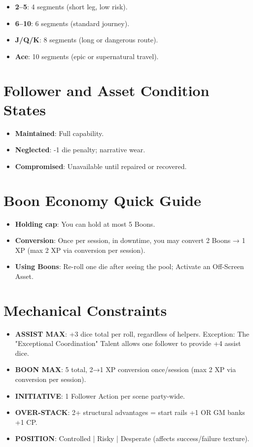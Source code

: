 \begin{itemize}
    \item \textbf{2--5}: 4 segments (short leg, low risk).
    \item \textbf{6--10}: 6 segments (standard journey).
    \item \textbf{J/Q/K}: 8 segments (long or dangerous route).
    \item \textbf{Ace}: 10 segments (epic or supernatural travel).
\end{itemize}

\section*{Follower and Asset Condition States}

\begin{itemize}
    \item \textbf{Maintained}: Full capability.
    \item \textbf{Neglected}: -1 die penalty; narrative wear.
    \item \textbf{Compromised}: Unavailable until repaired or recovered.
\end{itemize}

\section*{Boon Economy Quick Guide}

\begin{itemize}
    \item \textbf{Holding cap}: You can hold at most 5 Boons.
    \item \textbf{Conversion}: Once per session, in downtime, you may convert 2 Boons → 1 XP (max 2 XP via conversion per session).
    \item \textbf{Using Boons}: Re-roll one die after seeing the pool; Activate an Off-Screen Asset.
\end{itemize}

\section*{Mechanical Constraints}

\begin{itemize}
    \item \textbf{ASSIST MAX}: +3 dice total per roll, regardless of helpers. Exception: The "Exceptional Coordination" Talent allows one follower to provide +4 assist dice.
    \item \textbf{BOON MAX}: 5 total, 2→1 XP conversion once/session (max 2 XP via conversion per session).
    \item \textbf{INITIATIVE}: 1 Follower Action per scene party-wide.
    \item \textbf{OVER-STACK}: 2+ structural advantages = start rails +1 OR GM banks +1 CP.
    \item \textbf{POSITION}: Controlled | Risky | Desperate (affects success/failure texture).
\end{itemize}

